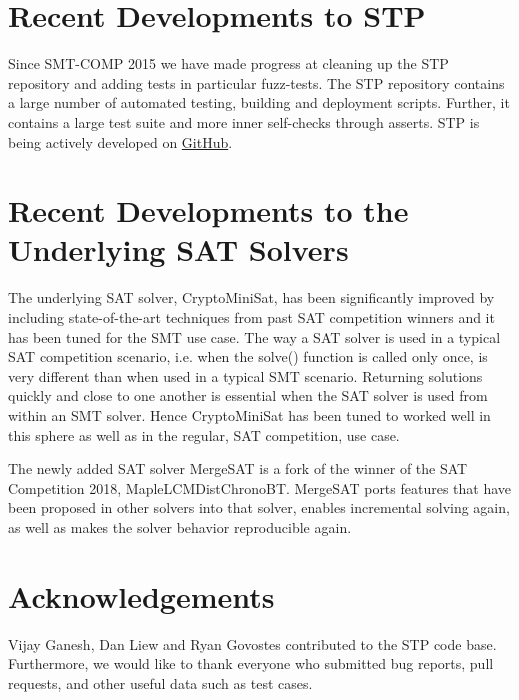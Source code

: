 \documentclass{easychair}
\begin{document}
\section{Recent Developments to STP}
Since SMT-COMP 2015 we have made progress at cleaning up the STP repository and adding tests in particular fuzz-tests.
The STP repository contains a large number of automated testing, building and deployment scripts.
Further, it contains a large test suite and more inner self-checks through asserts. STP is being actively developed on \href{https://github.com/stp/stp}{GitHub}.

\section{Recent Developments to the Underlying SAT Solvers}
The underlying SAT solver, CryptoMiniSat, has been significantly improved by including state-of-the-art techniques from past SAT competition winners and it has been tuned for the SMT use case.
The way a SAT solver is used in a typical SAT competition scenario, i.e. when the solve() function is called only once, is very different than when used in a typical SMT scenario.
Returning solutions quickly and close to one another is essential when the SAT solver is used from within an SMT solver.
Hence CryptoMiniSat has been tuned to worked well in this sphere as well as in the regular, SAT competition, use case.

The newly added SAT solver MergeSAT is a fork of the winner of the SAT Competition 2018, MapleLCMDistChronoBT.
MergeSAT ports features that have been proposed in other solvers into that solver, enables incremental solving again, as well as makes the solver behavior reproducible again.

\section*{Acknowledgements}
Vijay Ganesh, Dan Liew and Ryan Govostes contributed to the STP code base.
Furthermore, we would like to thank everyone who submitted bug reports, pull requests, and other useful data such as test cases.




\vfill
\pagebreak
\end{document}
